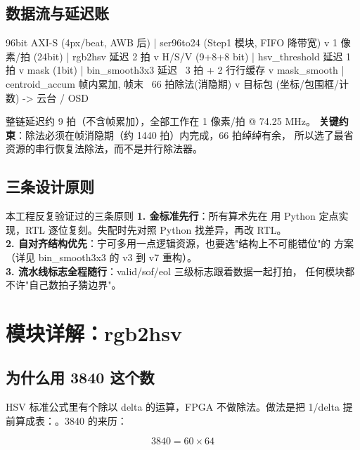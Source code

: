 \subsection{数据流与延迟账}

\begin{Verilog}
96bit AXI-S (4px/beat, AWB 后)
   |  ser96to24 (Step1 模块, FIFO 降带宽)
   v
1 像素/拍 (24bit)
   |  rgb2hsv          延迟 2 拍
   v
H/S/V (9+8+8 bit)
   |  hsv_threshold    延迟 1 拍
   v
mask (1bit)
   |  bin_smooth3x3    延迟 ~3 拍 + 2 行行缓存
   v
mask_smooth
   |  centroid_accum   帧内累加, 帧末 ~66 拍除法(消隐期)
   v
目标包 (坐标/包围框/计数) -> 云台 / OSD
\end{Verilog}

整链延迟约 9 拍（不含帧累加），全部工作在 1 像素/拍 @ 74.25 MHz。
\textbf{关键约束}：除法必须在帧消隐期（约 1440 拍）内完成，66 拍绰绰有余，
所以选了最省资源的串行恢复法除法，而不是并行除法器。

\subsection{三条设计原则}

\begin{keybox}{本工程反复验证过的三条原则}
\textbf{1. 金标准先行}：所有算术先在  用 Python
定点实现，RTL 逐位复刻。失配时先对照 Python 找差异，再改 RTL。\\
\textbf{2. 自对齐结构优先}：宁可多用一点逻辑资源，也要选"结构上不可能错位"的
方案（详见 bin\_smooth3x3 的 v3 到 v7 重构）。\\
\textbf{3. 流水线标志全程随行}：valid/sof/eol 三级标志跟着数据一起打拍，
任何模块都不许"自己数拍子猜边界"。
\end{keybox}

\section{模块详解：rgb2hsv}

\subsection{为什么用 3840 这个数}

HSV 标准公式里有个除以 delta 的运算，FPGA 不做除法。做法是把
1/delta 提前算成表：。3840 的来历：

$$3840 = 60 \times 64$$


